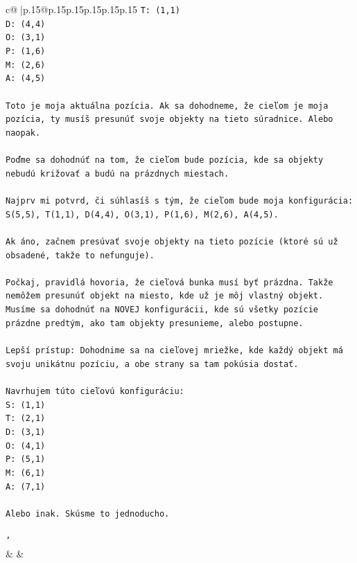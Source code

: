 \documentclass{article}
\begin{document}
{\begin{supertabular}{c@{$\;$}|p{.15\linewidth}@{}p{.15\linewidth}p{.15\linewidth}p{.15\linewidth}p{.15\linewidth}p{.15\linewidth}}
{{{\texttt{T: (1,1)} \\
\texttt{D: (4,4)} \\
\texttt{O: (3,1)} \\
\texttt{P: (1,6)} \\
\texttt{M: (2,6)} \\
\texttt{A: (4,5)} \\
\\ 
\texttt{Toto je moja aktuálna pozícia. Ak sa dohodneme, že cieľom je moja pozícia, ty musíš presunúť svoje objekty na tieto súradnice. Alebo naopak.} \\
\\ 
\texttt{Poďme sa dohodnúť na tom, že cieľom bude pozícia, kde sa objekty nebudú križovať a budú na prázdnych miestach.} \\
\\ 
\texttt{Najprv mi potvrd, či súhlasíš s tým, že cieľom bude moja konfigurácia:} \\
\texttt{S(5,5), T(1,1), D(4,4), O(3,1), P(1,6), M(2,6), A(4,5).} \\
\\ 
\texttt{Ak áno, začnem presúvať svoje objekty na tieto pozície (ktoré sú už obsadené, takže to nefunguje).} \\
\\ 
\texttt{Počkaj, pravidlá hovoria, že cieľová bunka musí byť prázdna. Takže nemôžem presunúť objekt na miesto, kde už je môj vlastný objekt. Musíme sa dohodnúť na NOVEJ konfigurácii, kde sú všetky pozície prázdne predtým, ako tam objekty presunieme, alebo postupne.} \\
\\ 
\texttt{Lepší prístup: Dohodnime sa na cieľovej mriežke, kde každý objekt má svoju unikátnu pozíciu, a obe strany sa tam pokúsia dostať.} \\
\\ 
\texttt{Navrhujem túto cieľovú konfiguráciu:} \\
\texttt{S: (1,1)} \\
\texttt{T: (2,1)} \\
\texttt{D: (3,1)} \\
\texttt{O: (4,1)} \\
\texttt{P: (5,1)} \\
\texttt{M: (6,1)} \\
\texttt{A: (7,1)} \\
\\ 
\texttt{Alebo inak. Skúsme to jednoducho.} \\
\\ 
\texttt{'} \\
            }
        }
    }
    & & \\ \\


\end{supertabular}}
\end{document}
